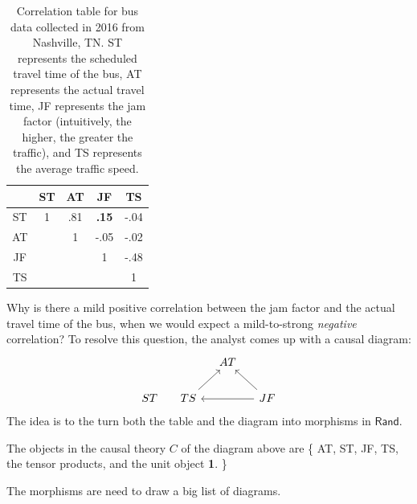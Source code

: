 \documentclass{article}
\theoremstyle{definition}
\newcommand{\grayout}[1]{{\color{gray}#1}}
\newcommand{\redout}[1]{{\color{red}#1}}
\newcommand{\Cat}[1]{\mathsf{#1}}
\def\Rand{\Cat{Rand}}
\def\One{\textbf{1}}
\begin{document}
\begin{table}[h!]
\begin{center}
\begin{tabular}{c|cccc}
& ST & AT & JF & TS \\ \hline
ST & 1 & .81 & \textbf{.15} & \grayout{-.04} \\
AT & & 1 & \grayout{-.05} & \grayout{-.02} \\
JF & & & 1 & -.48 \\
TS & & & & 1 \\
\end{tabular}
\end{center}
\caption{Correlation table for bus data collected in 2016 from Nashville, TN. ST represents the scheduled travel time of the bus, AT represents the actual travel time, JF represents the jam factor (intuitively, the higher, the greater the traffic), and TS represents the average traffic speed.}
\label{default}
\end{table}%
Why is there a mild positive correlation between the jam factor and the actual travel time of the bus, when we would expect a mild-to-strong \emph{negative} correlation? To resolve this question, the analyst comes up with a causal diagram:
\[
\begin{tikzcd}[column sep=small]
& & AT & \\
ST & TS \arrow{ur} & & JF \arrow{ul} \arrow{ll}
\end{tikzcd}
\]
The idea is to the turn both the table and the diagram into morphisms in $\Rand$.

The objects in the causal theory $C$ of the diagram above are \{ AT, ST, JF, TS, the tensor products, and the unit object \One. \}

The morphisms are \redout{need to draw a big list of diagrams}.
\end{document}
